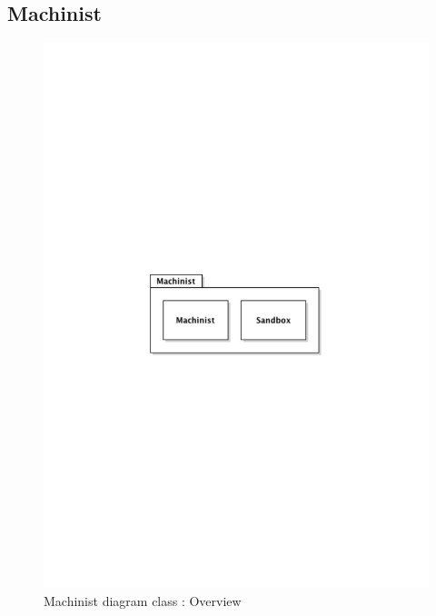 	\subsection{Machinist}
		\begin{figure}[ht]
			\begin{center}
				\includegraphics[width=\textwidth,  trim=2cm 12cm 2cm 12cm]{UML_figure/DC/core/machinist/DC_Machinist.pdf}
				\caption{Machinist diagram class : Overview}
			\end{center}
		\end{figure}
\newpage
